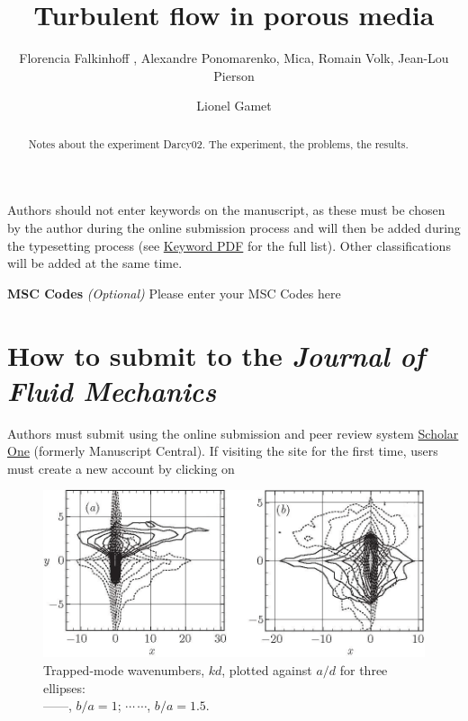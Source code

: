 \documentclass[lineno]{jfm}
\title{Turbulent flow in porous media}
\author{Florencia Falkinhoff\aff{1}
  \corresp{\email{florencia.falkinhoff@ens-lyon.fr}},
  Alexandre Ponomarenko\aff{1}, Mica\aff{1}, Romain Volk\aff{1}, Jean-Lou Pierson\aff{2}
 \and Lionel Gamet\aff{2}}
\affiliation{\aff{1}LPENS
\aff{2}IFPEN}
\begin{document}
\maketitle

\begin{abstract}
Notes about the experiment Darcy02. The experiment, the problems, the results.
\end{abstract}

\begin{keywords}
Authors should not enter keywords on the manuscript, as these must be chosen by the author during the online submission process and will then be added during the typesetting process (see \href{https://www.cambridge.org/core/journals/journal-of-fluid-mechanics/information/list-of-keywords}{Keyword PDF} for the full list).  Other classifications will be added at the same time.
\end{keywords}

{\bf MSC Codes }  {\it(Optional)} Please enter your MSC Codes here


\section{How to submit to the \emph{Journal of Fluid Mechanics}}
\label{sec:intro}

 Authors must submit using the online submission and peer review system \href{https://mc.manuscriptcentral.com/jfm} {Scholar One} (formerly Manuscript Central). If visiting the site for the first time, users must create a new account by clicking on 

\begin{figure}
  \centerline{\includegraphics{Fig1}}%
  \caption{Trapped-mode wavenumbers, $kd$, plotted against $a/d$ for
    three ellipses:\protect\\
    ---$\!$---,
    $b/a=1$; $\cdots$\,$\cdots$, $b/a=1.5$.}
\label{fig:ka}
\end{figure}
\end{document}
